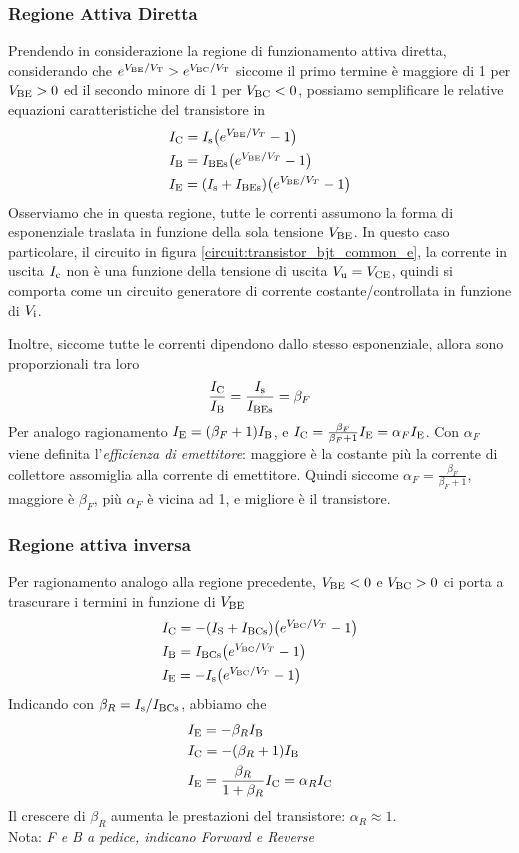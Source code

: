 \documentclass[../elettronica]{subfiles}
\begin{document}
\subsubsection{Regione Attiva Diretta}
Prendendo in considerazione la regione di funzionamento attiva diretta, considerando che $e^{\V{BE} / \V{T}} > e^{\V{BC}/{\V{T}}}$
siccome il primo termine è maggiore di 1 per $\V{BE} > 0$ ed il secondo minore di 1 per $\V{BC} < 0$, possiamo semplificare le relative
equazioni caratteristiche del transistore in
\begin{align*}
    &\I{C} = \diodecurrent[\I{s}]{\V{BE}}\\
    &\I{B} = \diodecurrent[\I{BEs}]{\V{BE}}\\
    &\I{E} = \diodecurrent[(\I{s} + \I{BEs})]{\V{BE}}
\end{align*}
Osserviamo che in questa regione, tutte le correnti assumono la forma di esponenziale traslata in funzione della sola tensione $\V{BE}$.
In questo caso particolare, il circuito in figura \ref{circuit:transistor_bjt_common_e}, la corrente in uscita $\I{c}$ non è una funzione della tensione
di uscita $\V{u} = \V{CE}$, quindi si comporta come un circuito generatore di corrente costante/controllata in funzione di $\V{i}$.

Inoltre, siccome tutte le correnti dipendono dallo stesso esponenziale, allora sono proporzionali tra loro
\[
    \frac{\I{C}}{\I{B}} = \frac{\I{s}}{\I{BEs}} = \beta_F
\]
Per analogo ragionamento $\I{E} = (\beta_F+1) \I{B}$, e $\I{C} = \frac{\beta_F}{\beta_F + 1}\I{E} = \alpha_F \I{E}$.
Con $\alpha_F$ viene definita l'\textit{efficienza di emettitore}: maggiore è la costante più la corrente di collettore assomiglia alla corrente di emettitore.
Quindi siccome $\alpha_F = \frac{\beta_F}{\beta_F + 1}$, maggiore è $\beta_F$, più $\alpha_F$ è vicina ad 1, e migliore è il transistore.

\subsubsection{Regione attiva inversa}
Per ragionamento analogo alla regione precedente, $\V{BE} < 0$ e $\V{BC} > 0$ ci porta a trascurare i termini in funzione di $\V{BE}$
\begin{align*}
    &\I{C} = -\diodecurrent[(\I{S} + \I{BCs})]{\V{BC}}\\
    &\I{B} = \diodecurrent[\I{BCs}]{\V{BC}}\\
    &\I{E} = -\diodecurrent[\I{s}]{\V{BC}}\\
\end{align*}
Indicando con $\beta_R = {\I{s}}/{\I{BCs}}$, abbiamo che
\begin{align*}
    &\I{E} = - \beta_R \I{B}\\
    &\I{C} = -(\beta_R + 1) \I{B}\\
    &\I{E} = \frac{\beta_R}{1 + \beta_R}\I{C} = \alpha_R \I{C}
\end{align*}
Il crescere di $\beta_R$ aumenta le prestazioni del transistore: $\alpha_R \approx 1$.
\\[1em]
Nota: \textit{F e B a pedice, indicano Forward e Reverse}
\end{document}
